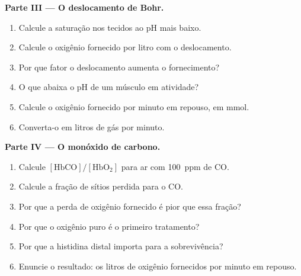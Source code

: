 \begin{problem}
\medskip\noindent\textbf{Parte III --- O deslocamento de Bohr.}
\begin{enumerate}[resume]
  \item Calcule a saturação nos tecidos ao pH mais baixo.
  \item Calcule o oxigênio fornecido por litro com o deslocamento.
  \item Por que fator o deslocamento aumenta o fornecimento?
  \item O que abaixa o pH de um músculo em atividade?
  \item Calcule o oxigênio fornecido por minuto em repouso, em mmol.
  \item Converta-o em litros de gás por minuto.
\end{enumerate}

\medskip\noindent\textbf{Parte IV --- O monóxido de carbono.}
\begin{enumerate}[resume]
  \item Calcule $[\mathrm{HbCO}]/[\mathrm{HbO_2}]$ para ar com \qty{100}{ppm} de CO.
  \item Calcule a fração de sítios perdida para o CO.
  \item Por que a perda de oxigênio fornecido é pior que essa fração?
  \item Por que o oxigênio puro é o primeiro tratamento?
  \item Por que a histidina distal importa para a sobrevivência?
  \item Enuncie o resultado: os litros de oxigênio fornecidos por minuto em repouso.
\end{enumerate}
\end{problem}
